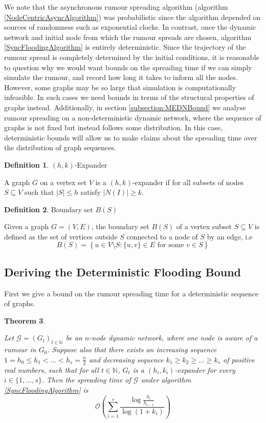 \documentclass[a4paper,11pt]{article}
\newtheorem{theorem}{Theorem}[section]
\theoremstyle{definition}
\newtheorem{definition}[theorem]{Definition}
\newcommand{\ModelIntro}{
	Let $\mathcal{G} = (G_t)_{t \in \mathbb{N}}$ be an $n$-node dynamic network, where one node is aware of a rumour in $G_0$.
}
\begin{document}
We note that the asynchronous rumour spreading algorithm (algorithm \ref{NodeCentricAsyncAlgorithm}) was probabilistic since the algorithm depended on sources of randomness such as exponential clocks. In contrast, once the dynamic network and initial node from which the rumour spreads are chosen, algorithm \ref{SyncFloodingAlgorithm} is entirely deterministic. Since the trajectory of the rumour spread is completely determined by the initial conditions, it is reasonable to question why we would want bounds on the spreading time if we can simply simulate the rumour, and record how long it takes to inform all the nodes. However, some graphs may be so large that simulation is computationally infeasible. In such cases we need bounds in terms of the structural properties of graphs instead. Additionally, in section \ref{subsection:MEDNBound}
we analyse rumour spreading on a non-deterministic dynamic network, where the sequence of graphs is not fixed but instead follows some distribution. In this case, deterministic bounds will allow us to make claims about the spreading time over the distribution of graph sequences.


\begin{definition}
	$(h, k)$-Expander

	\noindent
	A graph $G$ on a vertex set $V$ is a $(h, k)$-expander if for all subsets of nodes $S \subseteq V$ such that $|S| \leq h$ satisfy $|N(I)| \geq k$.
\end{definition}

\begin{definition}
	Boundary set $B(S)$

	\noindent 
	Given a graph $G=(V,E)$, the boundary set $B(S)$ of a vertex subset $S \subseteq V$ is defined as the set of vertices outside $S$ connected to a node of $S$ by an edge, i.e
	$$
		B(S) = \left\{u \in V \setminus S : \{u, v\} \in E \text{ for some } v \in S \right\}
	$$
\end{definition}

\subsection{Deriving the Deterministic Flooding Bound}

First we give a bound on the rumour spreading time for a deterministic sequence of graphs. 

\begin{theorem}\label{theorem:DeterministicFloodingBound}
	\ModelIntro Suppose also that there exists an increasing sequence $1 = h_0 \leq h_1 < \dots < h_s = \frac{n}{2}$ and decreasing sequence $k_1 \geq k_2 \geq \dots \geq k_s$ of positive real numbers, such that for all $t \in \mathbb{N}$, $G_t$ is a $(h_i, k_i)$-expander for every $i \in \{1, \dots , s\}$. Then the spreading time of $\mathcal{G}$ under algorithm \ref{SyncFloodingAlgorithm} is
	$$
		\mathcal{O}\left(\sum_{i=1}^s \frac{\log \frac{h_i}{h_{i-1}}}{\log(1+k_i)}\right)
	$$
\end{theorem}
\end{document}
